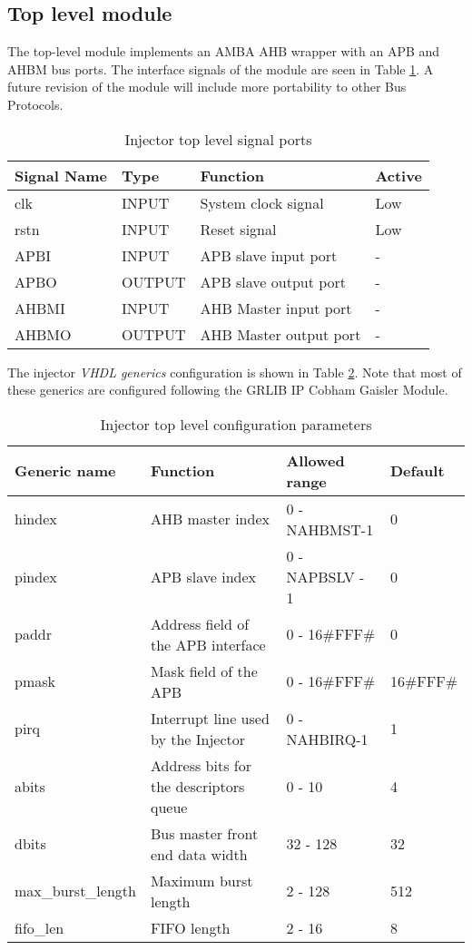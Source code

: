 \subsection{Top level module}\label{toplevel}
\label{top_module}

The top-level module implements an AMBA AHB wrapper with an APB and AHBM bus ports.
The interface signals of the module are seen in Table \ref{port:ahb}. A future revision of the module will include more portability to other Bus Protocols.\\
\vspace{0.3cm}
\begin{table}[ht]
	\scriptsize
	\centering
	\begin{tabular}{llll}
		\hline
		Signal Name & Type & Function & Active
		\\
		\hline
		clk & INPUT & System clock signal & Low
		\\
		rstn & INPUT & Reset signal & Low
		\\
		APBI & INPUT & APB slave input port & - 
		\\
		APBO & OUTPUT & APB slave output port & -
		\\
		AHBMI & INPUT & AHB Master input port & -
		\\
		AHBMO & OUTPUT & AHB Master output port & -
		\\
		\hline
	\end{tabular}
	\caption{Injector top level signal ports}
	\label{port:ahb}
\end{table}

The injector \emph{VHDL generics} configuration is shown in Table \ref{table:generics}. Note that most of these generics are configured following the GRLIB IP Cobham Gaisler Module. \\
\begin{table}[ht]
	\scriptsize
	\centering
	\begin{tabular}{llll}
		\hline
		Generic name & Function & Allowed range & Default
		\\
		\hline
		hindex & AHB master index & 0 - NAHBMST-1& 0
		\\
		pindex & APB slave index & 0 - NAPBSLV - 1 & 0
		\\
		paddr & Address field of the APB interface & 0 - 16\#FFF\# & 0 
		\\
		pmask & Mask field of the APB  & 0 - 16\#FFF\# & 16\#FFF\#
		\\
		pirq & Interrupt line used by the Injector & 0 - NAHBIRQ-1& 1
		\\
		abits & Address bits for the descriptors queue & 0 - 10 & 4
		\\
	    dbits & Bus master front end data width & 32 - 128 & 32
		\\
		max\_burst\_length & Maximum burst length & 2 - 128 & 512
		\\
		fifo\_len & FIFO length & 2 - 16 & 8
		\\
		\hline
	\end{tabular}
	\caption{Injector top level configuration parameters}
	\label{table:generics}
\end{table}

